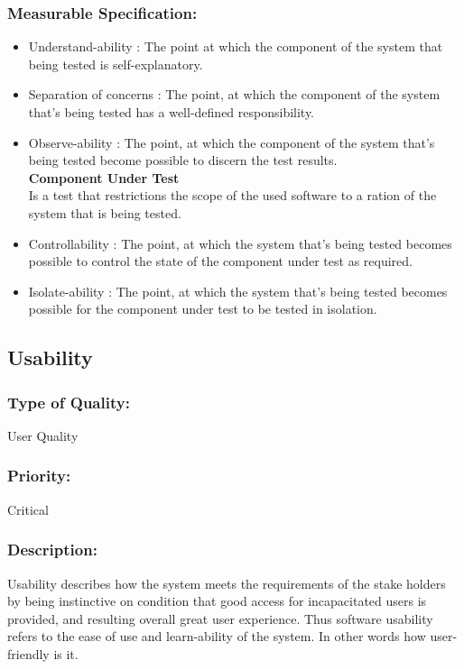 \documentclass[11pt]{article}
\begin{document}
		\subsubsection{Measurable Specification:}
		\begin{itemize}
			\item Understand-ability : The point at which the component of the system that being tested is self-explanatory.
			\item Separation of concerns : The point, at which the component of the system that's being tested has a well-defined responsibility.
			\item Observe-ability : The point, at which the component of the system that’s being tested become possible to discern the test results. \\
						
			\textbf{Component Under Test}\\
			Is a test that restrictions the scope of the used software to a ration of the system that is being tested.
			
			\item Controllability : The point, at which the system that’s being tested becomes possible to control the state of the component under test as required.
			\item Isolate-ability : The point, at which the system that’s being tested becomes possible for the component under test to be tested in isolation.
			
		\end{itemize}
		
		
	\subsection{Usability }
		
		\subsubsection{Type of Quality:}
			\textbf{} User Quality
		
		\subsubsection{Priority:}
		\textbf{} Critical
		
		\subsubsection{Description:}
			\textbf{}Usability describes how the system meets the requirements of the stake holders by being instinctive on condition that good access for incapacitated users is provided, and resulting overall great user experience. Thus software usability refers to the ease of use and learn-ability of the system. In other words how user-friendly is it.  
		
\end{document}

